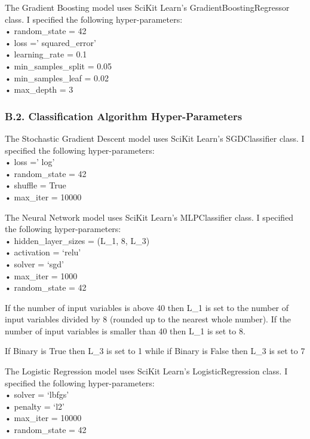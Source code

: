 \documentclass[11pt,preprint, authoryear]{elsarticle}
\numberwithin{equation}{section}
\numberwithin{figure}{section}
\numberwithin{table}{section}
\begin{document}
The Gradient Boosting model uses SciKit Learn's
GradientBoostingRegressor class. I specified the following
hyper-parameters:\\
• random\_state = 42\\
• loss =' squared\_error'\\
• learning\_rate = 0.1\\
• min\_samples\_split = 0.05\\
• min\_samples\_leaf = 0.02\\
• max\_depth = 3

\hypertarget{b.2.-classification-algorithm-hyper-parameters}{%
\subsubsection*{B.2. Classification Algorithm
Hyper-Parameters}\label{b.2.-classification-algorithm-hyper-parameters}}

The Stochastic Gradient Descent model uses SciKit Learn's SGDClassifier
class. I specified the following hyper-parameters:\\
• loss =' log'\\
• random\_state = 42\\
• shuffle = True\\
• max\_iter = 10000

The Neural Network model uses SciKit Learn's MLPClassifier class. I
specified the following hyper-parameters:\\
• hidden\_layer\_sizes = (L\_1, 8, L\_3)\\
• activation = `relu'\\
• solver = `sgd'\\
• max\_iter = 1000\\
• random\_state = 42

If the number of input variables is above 40 then L\_1 is set to the
number of input variables divided by 8 (rounded up to the nearest whole
number). If the number of input variables is smaller than 40 then L\_1
is set to 8.

If Binary is True then L\_3 is set to 1 while if Binary is False then
L\_3 is set to 7

The Logistic Regression model uses SciKit Learn's LogisticRegression
class. I specified the following hyper-parameters:\\
• solver = `lbfgs'\\
• penalty = `l2'\\
• max\_iter = 10000\\
• random\_state = 42
\end{document}
